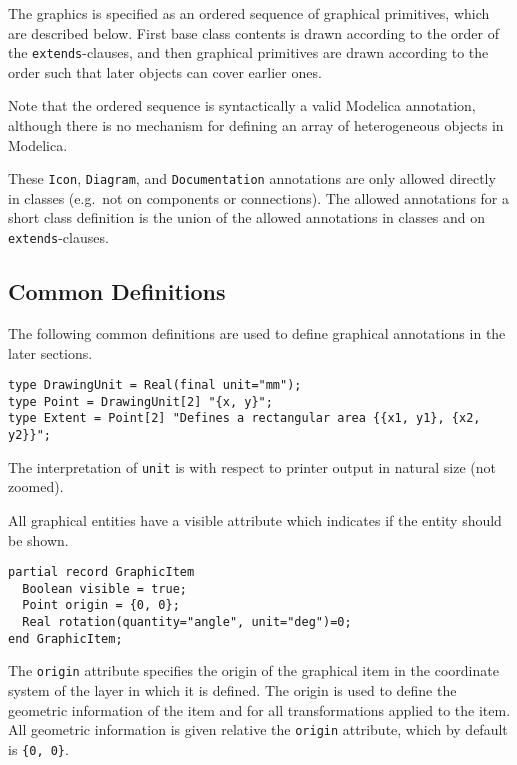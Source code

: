 The graphics is specified as an ordered sequence of graphical primitives, which are described below.
First base class contents is drawn according to the order of the \lstinline!extends!-clauses, and then graphical primitives are drawn according to the order such that later objects can cover earlier ones.

\begin{nonnormative}
Note that the ordered sequence is syntactically a valid Modelica annotation, although there
is no mechanism for defining an array of heterogeneous objects in Modelica.
\end{nonnormative}

These \lstinline!Icon!, \lstinline!Diagram!, and \lstinline!Documentation! annotations are only allowed directly in classes (e.g.\ not on components or connections).
The allowed annotations for a short class definition is the union of the allowed annotations in classes and on \lstinline!extends!-clauses.

\subsection{Common Definitions}\label{common-definitions}

The following common definitions are used to define graphical annotations in the later sections.
\begin{lstlisting}[language=modelica]
type DrawingUnit = Real(final unit="mm");
type Point = DrawingUnit[2] "{x, y}";
type Extent = Point[2] "Defines a rectangular area {{x1, y1}, {x2, y2}}";
\end{lstlisting}%
The interpretation of \lstinline!unit! is with respect to printer output in natural size (not zoomed).

All graphical entities have a visible attribute which indicates if the entity should be shown.
\begin{lstlisting}[language=modelica]
partial record GraphicItem
  Boolean visible = true;
  Point origin = {0, 0};
  Real rotation(quantity="angle", unit="deg")=0;
end GraphicItem;
\end{lstlisting}%
The \lstinline!origin! attribute specifies the origin of the graphical item in the coordinate system of the layer in which it is defined.
The origin is used to define the geometric information of the item and for all transformations applied to the item.
All geometric information is given relative the \lstinline!origin! attribute, which by default is \lstinline!{0, 0}!.

